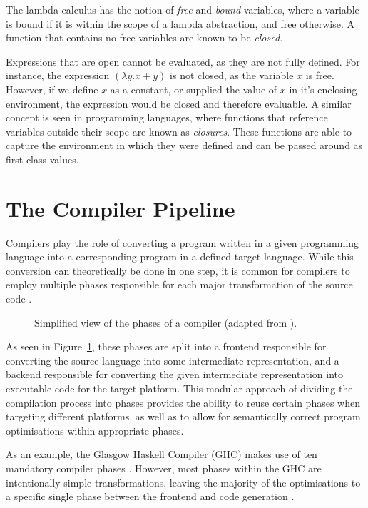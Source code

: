 The lambda calculus has the notion of \emph{free} and \emph{bound} variables, where a variable is
bound if it is within the scope of a lambda abstraction, and free otherwise. A function that
contains no free variables are known to be \emph{closed}.

Expressions that are open cannot be evaluated, as they are not fully defined. For instance, the
expression \((\lambda y. x + y)\) is not closed, as the variable \(x\) is free. However, if we
define \(x\) as a constant, or supplied the value of \(x\) in it's enclosing environment, the
expression would be closed and therefore evaluable. A similar concept is seen in programming
languages, where functions that reference variables outside their scope are known as
\emph{closures}. These functions are able to capture the environment in which they were defined and
can be passed around as first-class values.

\section{The Compiler Pipeline}

Compilers play the role of converting a program written in a given programming language into a
corresponding program in a defined target language. While this conversion can theoretically be done
in one step, it is common for compilers to employ multiple phases responsible for each major
transformation of the source code \autocite{grune2012modern}.

\begin{figure}
    \centering
    
    \caption{Simplified view of the phases of a compiler (adapted from \autocite{grune2012modern}).}
    \label{fig:compiler-pipeline}
\end{figure}

As seen in Figure~\ref{fig:compiler-pipeline}, these phases are split into a frontend responsible
for converting the source language into some intermediate representation, and a backend responsible
for converting the given intermediate representation into executable code for the target platform.
This modular approach of dividing the compilation process into phases provides the ability to reuse
certain phases when targeting different platforms, as well as to allow for semantically correct
program optimisations within appropriate phases.

As an example, the Glasgow Haskell Compiler (GHC) makes use of ten mandatory compiler phases
\autocite{ghccompiler}. However, most phases within the GHC are intentionally simple
transformations, leaving the majority of the optimisations to a specific single phase between the
frontend and code generation \autocite{jones1997transformation}.

